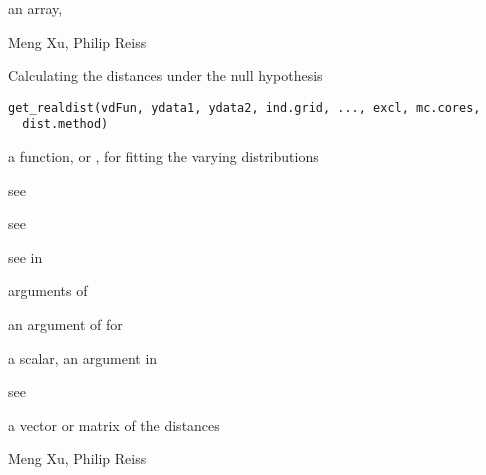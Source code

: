 \documentclass[a4paper]{book}
\begin{document}
%
\begin{Value}
an array, 
\end{Value}
%
\begin{Author}\relax
Meng Xu, Philip Reiss
\end{Author}
%
\begin{SeeAlso}\relax
{}
\end{SeeAlso}
%
\begin{Description}\relax
Calculating the distances under the null hypothesis
\end{Description}
%
\begin{Usage}
\begin{verbatim}
get_realdist(vdFun, ydata1, ydata2, ind.grid, ..., excl, mc.cores,
  dist.method)
\end{verbatim}
\end{Usage}
%
\begin{Arguments}
\begin{ldescription}
\item[\code{vdFun}] a function,  or , for fitting the varying distributions

\item[\code{ydata1}] see 

\item[\code{ydata2}] see 

\item[\code{ind.grid}] see  in 

\item[\code{...}] arguments of 

\item[\code{excl}] an argument of  for 

\item[\code{mc.cores}] a scalar, an argument in 

\item[\code{dist.method}] see 
\end{ldescription}
\end{Arguments}
%
\begin{Value}
a vector or matrix of the distances
\end{Value}
%
\begin{Author}\relax
Meng Xu, Philip Reiss
\end{Author}
%
\begin{SeeAlso}\relax
{}
\end{SeeAlso}
\end{document}
